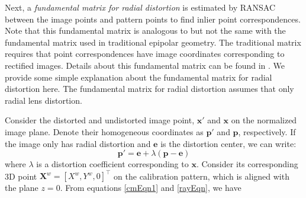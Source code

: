 \documentclass{report}
\begin{document}
Next, a \textit{fundamental matrix for radial distortion} is estimated by RANSAC between the image points and pattern points to find inlier point correspondences. Note that this fundamental matrix is analogous to but not the same with the fundamental matrix used in traditional epipolar geometry. The traditional matrix requires that point correspondences have image coordinates corresponding to rectified images. Details about this fundamental matrix can be found in \cite{hartley2007parameter}. We provide some simple explanation about the fundamental matrix for radial distortion here. The fundamental matrix for radial distortion assumes that only radial lens distortion. 

Consider the distorted and undistorted image point, $\mathbf{x}'$ and $\mathbf{x}$ on the normalized image plane. Denote their homogeneous coordinates as $\mathbf{p}'$ and $\mathbf{p}$, respectively. If the image only has radial distortion and $\mathbf{e}$ is the distortion center, we can write:
\begin{equation}
\mathbf{p}' = \mathbf{e} + \lambda (\mathbf{p} - \mathbf{e})
\end{equation}
where $\lambda$ is a distortion coefficient corresponding to $\mathbf{x}$. Consider its corresponding 3D point $\mathbf{X}^w = [X^w, Y^w, 0]^\top$ on the calibration pattern, which is aligned with the plane $z = 0$. From equations \ref{cmEqn1} and \ref{rayEqn}, we have
\end{document}
